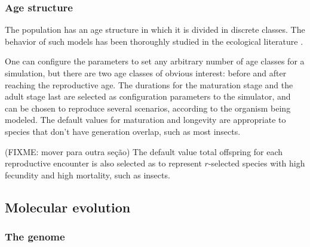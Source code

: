 \documentclass[10pt]{article}
\begin{document}



\subsubsection{Age structure}

The population has an age structure in which it is divided in discrete
classes. The behavior of such models has been thoroughly studied in
the ecological literature \cite{nisbet82}.

One can configure the parameters to set any arbitrary number of age
classes for a simulation, but there are two age classes of obvious
interest: before and after reaching the reproductive age. The
durations for the maturation stage and the adult stage last are
selected as configuration parameters to the simulator, and can be
chosen to reproduce several scenarios, according to the organism being
modeled. The default values for maturation and longevity are
appropriate to species that don't have generation overlap, such as
most insects.

(FIXME: mover para outra seção) The default value total offspring for
each reproductive encounter is also selected as to represent
$r$-selected species with high fecundity and high mortality, such as
insects.


\subsection{Molecular evolution}

\subsubsection{The genome}
\end{document}
